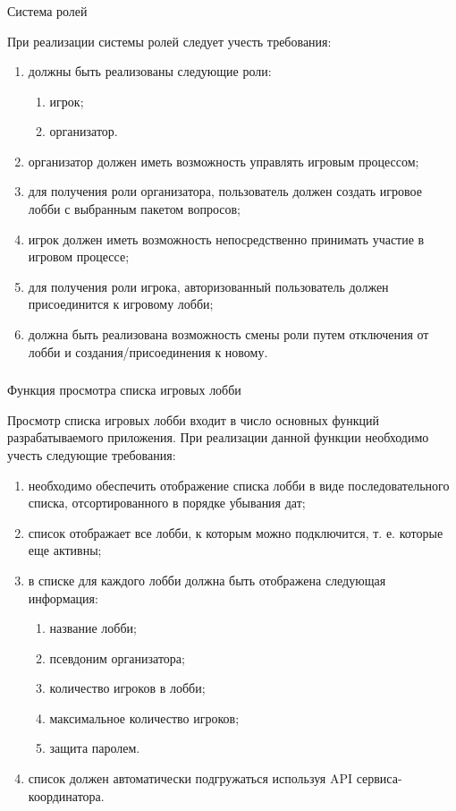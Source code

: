 \subsubsection{} Система ролей
\label{sec:domain:specification:roles}

При реализации системы ролей следует учесть требования:

\begin{enumerate}
	\item должны быть реализованы следующие роли:
	\begin{enumerate}
		\item игрок;
		\item организатор.
	\end{enumerate}
	\item организатор должен иметь возможность управлять игровым процессом;
	\item для получения роли организатора, пользователь должен создать игровое лобби с выбранным пакетом вопросов;
	\item игрок должен иметь возможность непосредственно принимать \linebreak участие в игровом процессе;
	\item для получения роли игрока, авторизованный пользователь должен присоединится к игровому лобби;
	\item должна быть реализована возможность смены роли путем отключения от лобби и создания/присоединения к новому.
\end{enumerate}

\subsubsection{} Функция просмотра списка игровых лобби
\label{sec:domain:specification:view_lobbies}

Просмотр списка игровых лобби входит в число основных функций разрабатываемого приложения. При реализации данной функции необходимо учесть следующие требования:

\begin{enumerate}
	\item необходимо обеспечить отображение списка лобби в виде последовательного списка, отсортированного в порядке убывания дат;
	\item список отображает все лобби, к которым можно подключится, т. е. которые еще активны;
	\item в списке для каждого лобби должна быть отображена следующая информация:
	\begin{enumerate}
		\item название лобби;
		\item псевдоним организатора;
		\item количество игроков в лобби;
		\item максимальное количество игроков;
		\item защита паролем.
	\end{enumerate}
	\item список должен автоматически подгружаться используя API сервиса-координатора. 
\end{enumerate}

